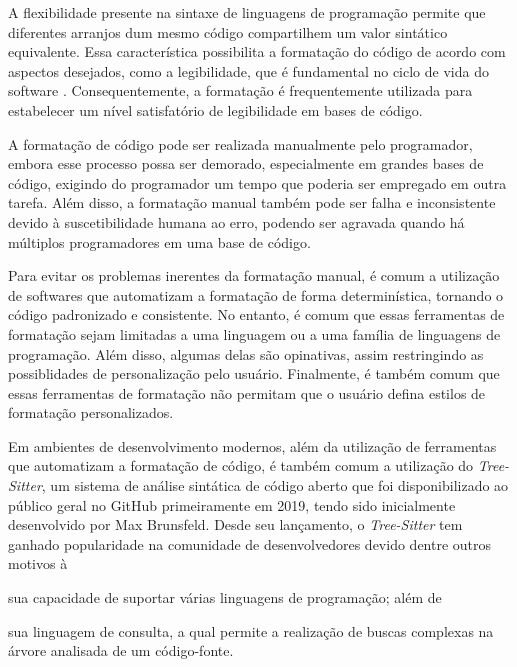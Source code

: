 \documentclass
  [11pt, a4paper, english, openright, sumario = tradicional, twoside, brazil]
  {abntex2}
\newcommand{\treesitter}{\textit{Tree-Sitter}\xspace}
\begin{document}
  A flexibilidade presente na sintaxe de linguagens de programação permite que
  diferentes arranjos dum mesmo código compartilhem um valor sintático
  equivalente. Essa característica possibilita a formatação do código de acordo
  com aspectos desejados, como a legibilidade, que é fundamental no ciclo de
  vida do software
  \cites[546]{buse-2009-learning}[1]{oliveira-2020-evaluating}.
  Consequentemente, a formatação é frequentemente utilizada para estabelecer um
  nível satisfatório de legibilidade em bases de código.

  A formatação de código pode ser realizada manualmente pelo programador,
  embora esse processo possa ser demorado, especialmente em grandes bases de
  código, exigindo do programador um tempo que poderia ser empregado em outra
  tarefa. Além disso, a formatação manual também pode ser falha e inconsistente
  devido à suscetibilidade humana ao erro, podendo ser agravada quando há
  múltiplos programadores em uma base de código.

  Para evitar os problemas inerentes da formatação manual, é comum a utilização
  de softwares que automatizam a formatação de forma determinística, tornando o
  código padronizado e consistente. No entanto, é comum que essas ferramentas
  de formatação sejam limitadas a uma linguagem ou a uma família de linguagens
  de programação. Além disso, algumas delas são opinativas, assim restringindo
  as possiblidades de personalização pelo usuário. Finalmente, é também comum
  que essas ferramentas de formatação não permitam que o usuário defina estilos
  de formatação personalizados.

  Em ambientes de desenvolvimento modernos, além da utilização de ferramentas
  que automatizam a formatação de código, é também comum a utilização do
  \treesitter \cite{tree-sitter-2018-tree}, um sistema de análise sintática de
  código aberto que foi disponibilizado ao público geral no GitHub
  primeiramente em 2019, tendo sido inicialmente desenvolvido por Max
  Brunsfeld. Desde seu lançamento, o \treesitter tem ganhado popularidade na
  comunidade de desenvolvedores devido dentre outros motivos à
  \begin{inparaenum}
    \item sua capacidade de suportar várias linguagens de programação; além de
    \item sua linguagem de consulta, a qual permite a realização de buscas
          complexas na árvore analisada de um código-fonte.
  \end{inparaenum}
\end{document}
